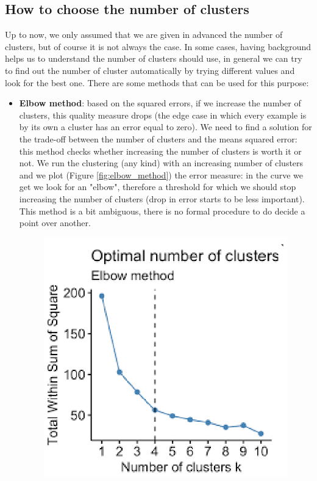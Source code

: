         \subsection{How to choose the number of clusters}
            Up to now, we only assumed that we are given in advanced the number of clusters, but of course it is not always the case. 
            In some cases, having background helps us to understand the number of clusters should use, in general we can try to find out the number of cluster automatically by trying different values and look for the best one.
            There are some methods that can be used for this purpose: 
            \begin{itemize}
                \item \textbf{Elbow method}: based on the squared errors, if we increase the number of clusters, this quality measure drops (the edge case in which every example is by its own a cluster has an error equal to zero). 
                We need to find a solution for the trade-off between the number of  clusters and the means squared error: this method checks whether increasing the number of clusters is worth it or not. 
                We run the clustering (any kind) with an increasing number of clusters and we plot (Figure \ref{fig:elbow_method}) the error measure: in the curve we get we look for an "elbow", therefore a threshold for which we should stop increasing the number of clusters (drop in error starts to be less important).
                This method is a bit ambiguous, there is no formal procedure to do decide a point over another.
                \begin{figure}
                    \centering
                    \includegraphics[scale=0.3]{images/elbow method.png}

\end{figure}
\end{itemize}
